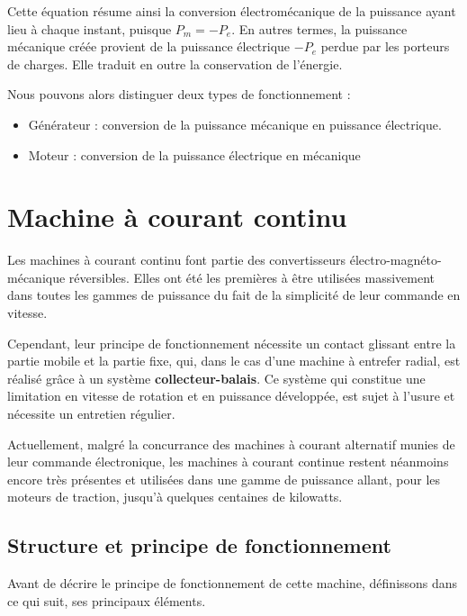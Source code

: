 \documentclass{article}
\begin{document}
Cette équation résume ainsi la conversion électromécanique de la puissance ayant lieu à chaque instant, puisque $P_m = - P_e$. En autres termes, la puissance mécanique créée provient de la puissance électrique $-P_e$ perdue par les porteurs de charges. Elle traduit en outre la conservation de l'énergie.\medskip

Nous pouvons alors distinguer deux types de fonctionnement :

\begin{itemize}
    \item Générateur : conversion de la puissance mécanique en puissance électrique.
    \item Moteur : conversion de la puissance électrique en mécanique
\end{itemize}




\section{Machine à courant continu}
Les machines à courant continu font partie des convertisseurs électro-magnéto-mécanique réversibles. Elles ont été les premières à être utilisées massivement dans toutes les gammes de puissance du fait de la simplicité de leur commande en vitesse.\medskip

Cependant, leur principe de fonctionnement nécessite un contact glissant entre la partie mobile et la partie fixe, qui, dans le cas d'une machine à entrefer radial, est réalisé grâce à un système \textbf{collecteur-balais}. Ce système qui constitue une limitation en vitesse de rotation et en puissance développée, est sujet à l'usure et nécessite un entretien régulier.\medskip

Actuellement, malgré la concurrance des machines à courant alternatif munies de leur commande électronique, les machines à courant continue restent néanmoins encore très présentes et utilisées dans une gamme de puissance allant, pour les moteurs de traction, jusqu'à quelques centaines de kilowatts.\medskip


\subsection{Structure et principe de fonctionnement}

Avant de décrire le principe de fonctionnement de cette machine, définissons dans ce qui suit, ses principaux éléments.\medskip
\end{document}
